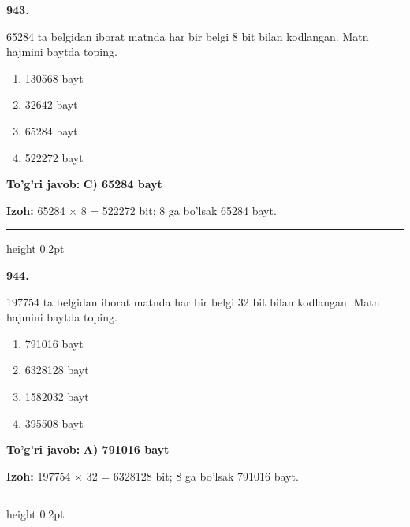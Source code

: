 \documentclass[10pt,a4paper,oneside]{article}
\begin{document}
\noindent\textbf{\color{ink}943.}
\par
65284 ta belgidan iborat matnda har bir belgi 8 bit bilan kodlangan. Matn hajmini baytda toping.
\begin{enumerate}[label=\Alph*),leftmargin=9mm]
\item 130568 bayt
\item 32642 bayt
\item 65284 bayt
\item 522272 bayt
\end{enumerate}
\begin{tcolorbox}[enhanced,breakable,colback=teal!4,colframe=teal!50!black,boxrule=0.5pt,arc=1.1mm,left=3mm,right=3mm,top=1.7mm,bottom=1.7mm,before skip=2mm,after skip=2mm]
\textbf{\color{teal}To'g'ri javob:} \textbf{C) 65284 bayt}
\par\smallskip
\textbf{Izoh:} 65284 \ensuremath{\times} 8 = 522272 bit; 8 ga bo'lsak 65284 bayt.
\end{tcolorbox}
\vspace{2mm}\hrule height 0.2pt \vspace{3mm}

\noindent\textbf{\color{ink}944.}
\par
197754 ta belgidan iborat matnda har bir belgi 32 bit bilan kodlangan. Matn hajmini baytda toping.
\begin{enumerate}[label=\Alph*),leftmargin=9mm]
\item 791016 bayt
\item 6328128 bayt
\item 1582032 bayt
\item 395508 bayt
\end{enumerate}
\begin{tcolorbox}[enhanced,breakable,colback=teal!4,colframe=teal!50!black,boxrule=0.5pt,arc=1.1mm,left=3mm,right=3mm,top=1.7mm,bottom=1.7mm,before skip=2mm,after skip=2mm]
\textbf{\color{teal}To'g'ri javob:} \textbf{A) 791016 bayt}
\par\smallskip
\textbf{Izoh:} 197754 \ensuremath{\times} 32 = 6328128 bit; 8 ga bo'lsak 791016 bayt.
\end{tcolorbox}
\vspace{2mm}\hrule height 0.2pt \vspace{3mm}
\end{document}
